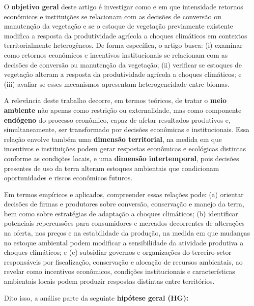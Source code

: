 O \textbf{objetivo geral} deste artigo é investigar como e em que intensidade retornos econômicos e instituições se relacionam com as decisões de conversão ou manutenção da vegetação e se o estoque de vegetação previamente existente modifica a resposta da produtividade agrícola a choques climáticos em contextos territorialmente heterogêneos. De forma específica, o artigo busca: (i) examinar como retornos econômicos e incentivos institucionais se relacionam com as decisões de conversão ou manutenção da vegetação; (ii) verificar se estoques de vegetação alteram a resposta da produtividade agrícola a choques climáticos; e (iii) avaliar se esses mecanismos apresentam heterogeneidade entre biomas.

A relevância deste trabalho decorre, em termos teóricos, de tratar o \textbf{meio ambiente} não apenas como restrição ou externalidade, mas como componente \textbf{endógeno} do processo econômico, capaz de afetar resultados produtivos e, simultaneamente, ser transformado por decisões econômicas e institucionais. Essa relação envolve também uma \textbf{dimensão territorial}, na medida em que incentivos e instituições podem gerar respostas econômicas e ecológicas distintas conforme as condições locais, e uma \textbf{dimensão intertemporal}, pois decisões presentes de uso da terra alteram estoques ambientais que condicionam oportunidades e riscos econômicos futuros. 

Em termos empíricos e aplicados, compreender essas relações pode: (a) orientar decisões de firmas e produtores sobre conversão, conservação e manejo da terra, bem como sobre estratégias de adaptação a choques climáticos; (b) identificar potenciais repercussões para consumidores e mercados decorrentes de alterações na oferta, nos preços e na estabilidade da produção, na medida em que mudanças no estoque ambiental podem modificar a sensibilidade da atividade produtiva a choques climáticos; e (c) subsidiar governos e organizações do terceiro setor responsáveis por fiscalização, conservação e alocação de recursos ambientais, ao revelar como incentivos econômicos, condições institucionais e características ambientais locais podem produzir respostas distintas entre territórios.


Dito isso, a análise parte da seguinte \textbf{hipótese geral (HG):} 

